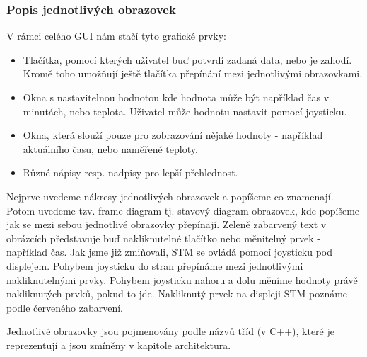 \subsubsection{Popis jednotlivých obrazovek}

V rámci celého GUI nám stačí tyto grafické prvky:
\begin{itemize}
  \item Tlačítka, pomocí kterých uživatel buď potvrdí zadaná data, nebo je zahodí.
    Kromě toho umožňují ještě tlačítka přepínání mezi jednotlivými obrazovkami.
  \item Okna s nastavitelnou hodnotou kde hodnota může být například čas v minutách, nebo teplota.
    Uživatel může hodnotu nastavit pomocí joysticku.
  \item Okna, která slouží pouze pro zobrazování nějaké hodnoty - například aktuálního času, nebo
    naměřené teploty.
  \item Různé nápisy resp. nadpisy pro lepší přehlednost.
\end{itemize}

Nejprve uvedeme nákresy jednotlivých obrazovek a popíšeme co znamenají.
Potom uvedeme tzv. frame diagram tj. stavový diagram obrazovek, kde popíšeme jak se mezi sebou
jednotlivé obrazovky přepínají.
Zeleně zabarvený text v obrázcích představuje buď nakliknutelné tlačítko nebo měnitelný prvek - například čas.
Jak jsme již zmiňovali, STM se ovládá pomocí joysticku pod displejem.
Pohybem joysticku do stran přepínáme mezi jednotlivými nakliknutelnými prvky.
Pohybem joysticku nahoru a dolu měníme hodnoty právě nakliknutých prvků, pokud to jde.
Nakliknutý prvek na displeji STM poznáme podle červeného zabarvení.

Jednotlivé obrazovky jsou pojmenovány podle názvů tříd (v C++), které je reprezentují a jsou zmíněny
v kapitole architektura.

